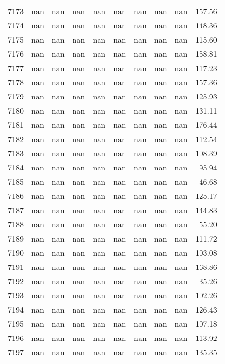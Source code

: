 \begin{tabular}{lrrrrrrrrr}
7173 & nan & nan & nan & nan & nan & nan & nan & nan & 157.56 \\
7174 & nan & nan & nan & nan & nan & nan & nan & nan & 148.36 \\
7175 & nan & nan & nan & nan & nan & nan & nan & nan & 115.60 \\
7176 & nan & nan & nan & nan & nan & nan & nan & nan & 158.81 \\
7177 & nan & nan & nan & nan & nan & nan & nan & nan & 117.23 \\
7178 & nan & nan & nan & nan & nan & nan & nan & nan & 157.36 \\
7179 & nan & nan & nan & nan & nan & nan & nan & nan & 125.93 \\
7180 & nan & nan & nan & nan & nan & nan & nan & nan & 131.11 \\
7181 & nan & nan & nan & nan & nan & nan & nan & nan & 176.44 \\
7182 & nan & nan & nan & nan & nan & nan & nan & nan & 112.54 \\
7183 & nan & nan & nan & nan & nan & nan & nan & nan & 108.39 \\
7184 & nan & nan & nan & nan & nan & nan & nan & nan & 95.94 \\
7185 & nan & nan & nan & nan & nan & nan & nan & nan & 46.68 \\
7186 & nan & nan & nan & nan & nan & nan & nan & nan & 125.17 \\
7187 & nan & nan & nan & nan & nan & nan & nan & nan & 144.83 \\
7188 & nan & nan & nan & nan & nan & nan & nan & nan & 55.20 \\
7189 & nan & nan & nan & nan & nan & nan & nan & nan & 111.72 \\
7190 & nan & nan & nan & nan & nan & nan & nan & nan & 103.08 \\
7191 & nan & nan & nan & nan & nan & nan & nan & nan & 168.86 \\
7192 & nan & nan & nan & nan & nan & nan & nan & nan & 35.26 \\
7193 & nan & nan & nan & nan & nan & nan & nan & nan & 102.26 \\
7194 & nan & nan & nan & nan & nan & nan & nan & nan & 126.43 \\
7195 & nan & nan & nan & nan & nan & nan & nan & nan & 107.18 \\
7196 & nan & nan & nan & nan & nan & nan & nan & nan & 113.92 \\
7197 & nan & nan & nan & nan & nan & nan & nan & nan & 135.35 \\

\end{tabular}
